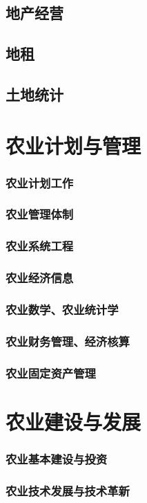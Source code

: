 \documentclass[UTF8]{../../RepresentationUniverse}
\begin{document}
    \subsection{地产经营}
    \subsection{地租}
    \subsection{土地统计}
\section{农业计划与管理}
    \subsubsection{农业计划工作}
    \subsubsection{农业管理体制}
    \subsubsection{农业系统工程}
    \subsubsection{农业经济信息}
    \subsubsection{农业数学、农业统计学}
    \subsubsection{农业财务管理、经济核算}
    \subsubsection{农业固定资产管理}
\section{农业建设与发展}
    \subsubsection{农业基本建设与投资}
    \subsubsection{农业技术发展与技术革新}
\end{document}
